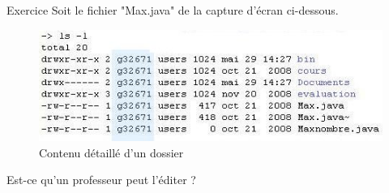 \documentclass[a4paper,11pt]{style-esi/td}
\begin{document}
\begin{Exercice}{Exercice}
	Soit le fichier "Max.java" de la capture d'écran ci-dessous.  
	\begin{figure}[hbt]
		\begin{center}
			\includegraphics[width=0.8\linewidth,height=0.8\textheight,keepaspectratio=true]{image/ls-l.jpg}
			
		\end{center}
		
		\caption[Contenu détaillé d'un dossier]{Contenu détaillé d'un dossier}
	\end{figure}
	
	Est-ce qu'un professeur peut l'éditer ? 
	
\end{Exercice}	
\end{document}
